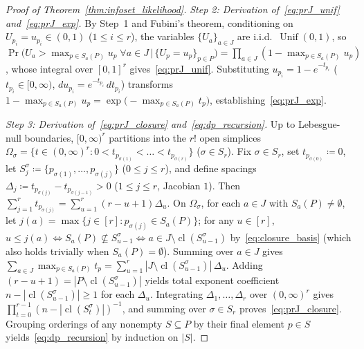 \documentclass[12pt]{article}
\theoremstyle{definition}
\DeclareMathOperator{\cl}{cl}
\DeclareMathOperator{\Unif}{Unif}
\begin{document}
\begin{proof}[Proof of Theorem~\ref{thm:infoset_likelihood}]
\emph{Step 2: Derivation of~\eqref{eq:prJ_unif} and~\eqref{eq:prJ_exp}.}
By Step~1 and Fubini's theorem, conditioning on $U_{p_i} = u_{p_i} \in (0, 1)$ ($1 \le i \le r$), the variables
$\{U_a\}_{a \in J}$ are i.i.d.\ $\Unif(0, 1)$, so $\Pr\bigl(U_a > \max_{p \in S_a(P)} u_p\;\forall a \in J \,\big|\,
\{U_p = u_p\}_{p \in P}\bigr) = \prod_{a \in J} (1 - \max_{p \in S_a(P)} u_p)$, whose integral over $[0, 1]^r$
gives~\eqref{eq:prJ_unif}. Substituting $u_{p_i} = 1 - e^{-t_{p_i}}$ ($t_{p_i} \in [0, \infty)$, $du_{p_i} =
e^{-t_{p_i}}\,dt_{p_i}$) transforms $1 - \max_{p \in S_a(P)} u_p = \exp\bigl(-\max_{p \in S_a(P)} t_p\bigr)$,
establishing~\eqref{eq:prJ_exp}.

\emph{Step 3: Derivation of~\eqref{eq:prJ_closure} and~\eqref{eq:dp_recursion}.} Up to Lebesgue-null boundaries,
$[0, \infty)^r$ partitions into the $r!$ open simplices $\Omega_\sigma = \{t \in (0, \infty)^r : 0 <
t_{p_{\sigma(1)}} < \dots < t_{p_{\sigma(r)}}\}$ ($\sigma \in S_r$). Fix $\sigma \in S_r$, set $t_{p_{\sigma(0)}}
\coloneqq 0$, let $S_j^\sigma \coloneqq \{p_{\sigma(1)}, \dots, p_{\sigma(j)}\}$ ($0 \le j \le r$), and define
spacings $\Delta_j \coloneqq t_{p_{\sigma(j)}} - t_{p_{\sigma(j-1)}} > 0$ ($1 \le j \le r$, Jacobian $1$). Then
$\sum_{j=1}^r t_{p_{\sigma(j)}} = \sum_{u=1}^r (r - u + 1)\Delta_u$. On $\Omega_\sigma$, for each $a \in J$ with
$S_a(P) \neq \emptyset$, let $j(a) = \max\{j \in [r] : p_{\sigma(j)} \in S_a(P)\}$; for any $u \in [r]$, $u \le
j(a) \iff S_a(P) \not\subseteq S_{u-1}^\sigma \iff a \in J \setminus \cl(S_{u-1}^\sigma)$ by~\eqref{eq:closure_basis}
(which also holds trivially when $S_a(P) = \emptyset$). Summing over $a \in J$ gives $\sum_{a \in J} \max_{p \in
S_a(P)} t_p = \sum_{u=1}^r |J \setminus \cl(S_{u-1}^\sigma)|\,\Delta_u$. Adding $(r - u + 1) = |P \setminus
\cl(S_{u-1}^\sigma)|$ yields total exponent coefficient $n - |\cl(S_{u-1}^\sigma)| \ge 1$ for each $\Delta_u$.
Integrating $\Delta_1, \dots, \Delta_r$ over $(0, \infty)^r$ gives $\prod_{t=0}^{r-1} (n -
|\cl(S_t^\sigma)|)^{-1}$, and summing over $\sigma \in S_r$ proves~\eqref{eq:prJ_closure}. Grouping orderings of
any nonempty $S \subseteq P$ by their final element $p \in S$ yields~\eqref{eq:dp_recursion} by induction on $|S|$.
\end{proof}

\printbibliography[heading=bibintoc,title={References}]
\end{document}

